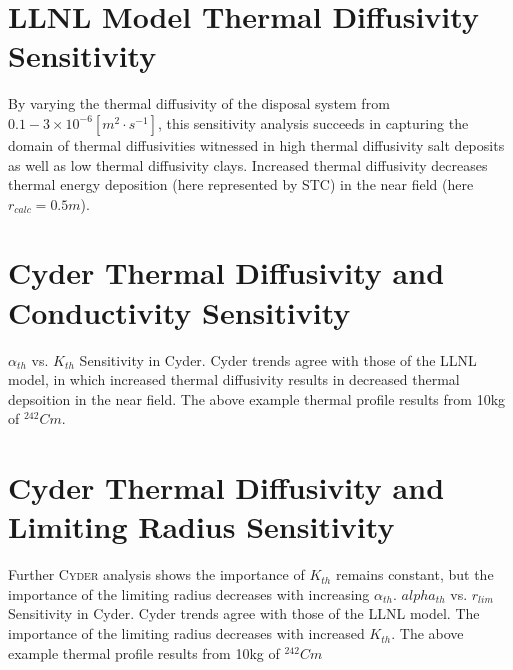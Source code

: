 \documentclass[letterpaper]{article}
\newcommand{\Cyder}{\textsc{Cyder}\xspace}
\begin{document}
\section*{LLNL Model Thermal Diffusivity Sensitivity}
  By varying the thermal diffusivity of the disposal system from $0.1-3\times 
  10^{-6} [m^2\cdot s^{-1}]$, this sensitivity analysis succeeds in capturing 
  the domain of 
  thermal diffusivities witnessed in high thermal diffusivity salt deposits as 
  well as low thermal diffusivity clays.
    Increased thermal diffusivity decreases thermal energy deposition (here represented by STC) in the near field (here $r_{calc} = 0.5m$).


\section*{Cyder Thermal Diffusivity and Conductivity Sensitivity}
$\alpha_{th}$ vs. $K_{th}$ Sensitivity in Cyder. Cyder trends agree
  with those of the LLNL model, in which increased thermal diffusivity results 
  in 
  decreased thermal depsoition in the near field. The above example thermal 
  profile results from 10kg of $^{242}Cm$.

\section*{Cyder Thermal Diffusivity and Limiting Radius Sensitivity}
  Further \Cyder analysis shows the importance of $K_{th}$ remains constant, 
  but 
  the importance of the limiting radius decreases with increasing 
  $\alpha_{th}$.
  $alpha_{th}$ vs. $r_{lim}$ Sensitivity in Cyder.
  Cyder trends agree with 
  those of the LLNL model. The importance of the limiting radius decreases with 
  increased $K_{th}$. The above example thermal profile results from 10kg of 
  $^{242}Cm$

\pagebreak


\end{document}
